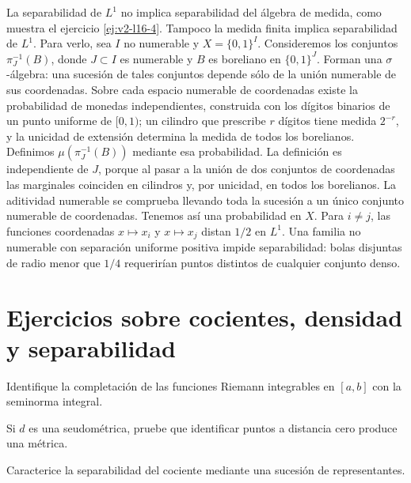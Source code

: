 \begin{observacion}
La separabilidad de $L^1$ no implica separabilidad del álgebra de medida, como muestra el ejercicio \ref{ej:v2-l16-4}. Tampoco la medida finita implica separabilidad de $L^1$. Para verlo, sea $I$ no numerable y $X=\{0,1\}^I$. Consideremos los conjuntos $\pi_J^{-1}(B)$, donde $J\subset I$ es numerable y $B$ es boreliano en $\{0,1\}^J$. Forman una $\sigma$-álgebra: una sucesión de tales conjuntos depende sólo de la unión numerable de sus coordenadas. Sobre cada espacio numerable de coordenadas existe la probabilidad de monedas independientes, construida con los dígitos binarios de un punto uniforme de $[0,1)$; un cilindro que prescribe $r$ dígitos tiene medida $2^{-r}$, y la unicidad de extensión determina la medida de todos los borelianos. Definimos $\mu(\pi_J^{-1}(B))$ mediante esa probabilidad. La definición es independiente de $J$, porque al pasar a la unión de dos conjuntos de coordenadas las marginales coinciden en cilindros y, por unicidad, en todos los borelianos. La aditividad numerable se comprueba llevando toda la sucesión a un único conjunto numerable de coordenadas. Tenemos así una probabilidad en $X$. Para $i\ne j$, las funciones coordenadas $x\mapsto x_i$ y $x\mapsto x_j$ distan $1/2$ en $L^1$. Una familia no numerable con separación uniforme positiva impide separabilidad: bolas disjuntas de radio menor que $1/4$ requerirían puntos distintos de cualquier conjunto denso.
\end{observacion}

\section{Ejercicios sobre cocientes, densidad y separabilidad}
\begin{ejercicio}\label{ej:v2-l16-1}
Identifique la completación de las funciones Riemann integrables en $[a,b]$ con la seminorma integral.
\end{ejercicio}

\begin{ejercicio}\label{ej:v2-l16-2}
Si $d$ es una seudométrica, pruebe que identificar puntos a distancia cero produce una métrica.
\end{ejercicio}

\begin{ejercicio}\label{ej:v2-l16-3}
Caracterice la separabilidad del cociente mediante una sucesión de representantes.
\end{ejercicio}

